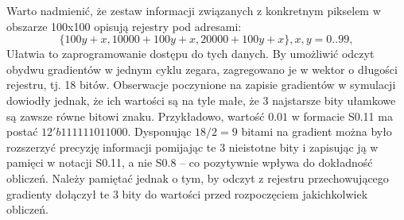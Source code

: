 \newline
Warto nadmienić, że zestaw informacji związanych z konkretnym pikselem w obszarze 100x100 opisują rejestry pod adresami:
\begin{equation}
\{100y+x, 10000+100y+x, 20000+100y+x\}, x,y=0..99,
\end{equation}
Ułatwia to zaprogramowanie dostępu do tych danych. %
By umożliwić odczyt obydwu gradientów w jednym cyklu zegara, zagregowano je w wektor o długości rejestru, tj. 18 bitów. 
Obserwacje poczynione na zapisie gradientów w symulacji dowiodły jednak, że ich wartości są na tyle małe, że 3 najstarsze bity ułamkowe są zawsze równe bitowi znaku. Przykładowo, wartość $0.01$ w formacie S0.11 ma postać $12'b111111011000$. Dysponując $18/2=9$ bitami na gradient można było rozszerzyć precyzję informacji pomijając te 3 nieistotne bity i zapisując ją w pamięci w notacji S0.11, a nie S0.8 -- co pozytywnie wpływa do dokładność obliczeń. Należy pamiętać jednak o tym, by odczyt z rejestru przechowującego gradienty dołączył te 3 bity do wartości przed rozpoczęciem jakichkolwiek obliczeń. %

